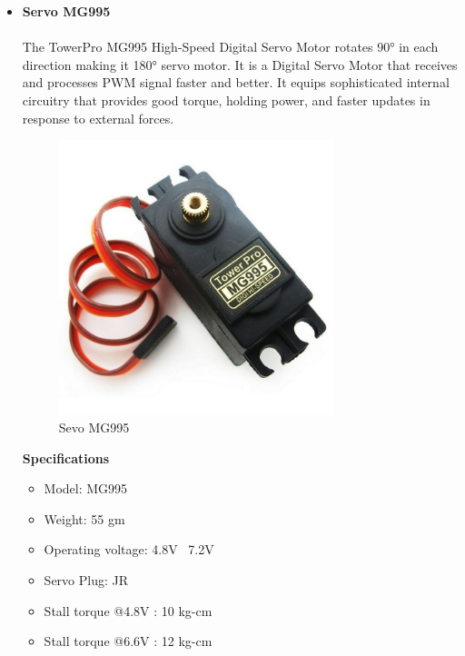 \begin{itemize}[wide, labelwidth=!, labelindent=0pt]
    \newpage
    
    \item \textbf{Servo MG995}
    \vspace{-0.5cm}
    \paragraph{}The TowerPro MG995 High-Speed Digital Servo Motor rotates 90° in each direction making it 180° servo motor. It is a Digital Servo Motor that receives and processes PWM signal faster and better. It equips sophisticated internal circuitry that provides good torque, holding power, and faster updates in response to external forces.
    
    \begin{figure}[H]
    \centering
    \includegraphics[width = 8cm]{project/images/mg995.jpg}
    \caption{Sevo MG995}
    \end{figure}
    
    \begin{center}{\textbf{Specifications}}\end{center}
    
    \begin{itemize}
        \item Model: MG995
        \item Weight: 55 gm
        \item Operating voltage: 4.8V~ 7.2V
        \item Servo Plug: JR
        \item Stall torque @4.8V : 10 kg-cm
        \item Stall torque @6.6V : 12 kg-cm
    \end{itemize}

\end{itemize}

